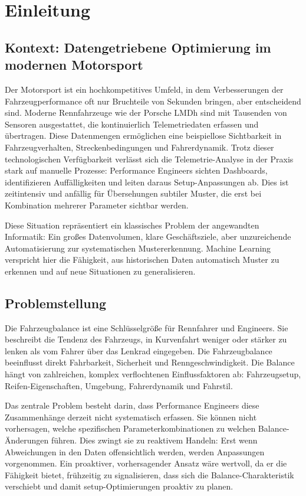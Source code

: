 \chapter{Einleitung}

\section{Kontext: Datengetriebene Optimierung im modernen Motorsport}

Der Motorsport ist ein hochkompetitives Umfeld, in dem Verbesserungen der Fahrzeugperformance oft nur Bruchteile von Sekunden bringen, aber entscheidend sind. Moderne Rennfahrzeuge wie der Porsche LMDh sind mit Tausenden von Sensoren ausgestattet, die kontinuierlich Telemetriedaten erfassen und übertragen. Diese Datenmengen ermöglichen eine beispiellose Sichtbarkeit in Fahrzeugverhalten, Streckenbedingungen und Fahrerdynamik. Trotz dieser technologischen Verfügbarkeit verlässt sich die Telemetrie-Analyse in der Praxis stark auf manuelle Prozesse: Performance Engineers sichten Dashboards, identifizieren Auffälligkeiten und leiten daraus Setup-Anpassungen ab. Dies ist zeitintensiv und anfällig für Übersehungen subtiler Muster, die erst bei Kombination mehrerer Parameter sichtbar werden.

Diese Situation repräsentiert ein klassisches Problem der angewandten Informatik: Ein großes Datenvolumen, klare Geschäftsziele, aber unzureichende Automatisierung zur systematischen Mustererkennung. Machine Learning verspricht hier die Fähigkeit, aus historischen Daten automatisch Muster zu erkennen und auf neue Situationen zu generalisieren.

\section{Problemstellung}

Die Fahrzeugbalance ist eine Schlüsselgröße für Rennfahrer und Engineers. Sie beschreibt die Tendenz des Fahrzeugs, in Kurvenfahrt weniger oder stärker zu lenken als vom Fahrer über das Lenkrad eingegeben. Die Fahrzeugbalance beeinflusst direkt Fahrbarkeit, Sicherheit und Renngeschwindigkeit. Die Balance hängt von zahlreichen, komplex verflochtenen Einflussfaktoren ab: Fahrzeugsetup, Reifen-Eigenschaften, Umgebung, Fahrerdynamik und Fahrstil.

Das zentrale Problem besteht darin, dass Performance Engineers diese Zusammenhänge derzeit nicht systematisch erfassen. Sie können nicht vorhersagen, welche spezifischen Parameterkombinationen zu welchen Balance-Änderungen führen. Dies zwingt sie zu reaktivem Handeln: Erst wenn Abweichungen in den Daten offensichtlich werden, werden Anpassungen vorgenommen. Ein proaktiver, vorhersagender Ansatz wäre wertvoll, da er die Fähigkeit bietet, frühzeitig zu signalisieren, dass sich die Balance-Charakteristik verschiebt und damit setup-Optimierungen proaktiv zu planen.

